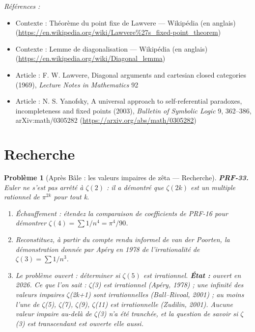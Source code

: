 \documentclass[11pt]{article}
\newtheorem{problem}{Problème}
\newenvironment{refs}{\par\small\noindent\emph{Références :}\begin{itemize}\setlength\itemsep{0pt}}{\end{itemize}\normalsize}
\begin{document}
\begin{refs}
\item Contexte : Théorème du point fixe de Lawvere --- Wikipédia (en anglais) (\url{https://en.wikipedia.org/wiki/Lawvere%27s_fixed-point_theorem})
\item Contexte : Lemme de diagonalisation --- Wikipédia (en anglais) (\url{https://en.wikipedia.org/wiki/Diagonal_lemma})
\item Article : F. W. Lawvere, \og{} Diagonal arguments and cartesian closed categories \fg{} (1969), \textit{Lecture Notes in Mathematics} 92
\item Article : N. S. Yanofsky, \og{} A universal approach to self-referential paradoxes, incompleteness and fixed points \fg{} (2003), \textit{Bulletin of Symbolic Logic} 9, 362--386, arXiv:math/0305282 (\url{https://arxiv.org/abs/math/0305282})
\end{refs}

\bigskip


\section*{Recherche}

\begin{problem}[{Après Bâle : les valeurs impaires de zêta --- Recherche}]
\textbf{PRF-33.} Euler ne s'est pas arrêté à $ \zeta(2) $ : il a démontré
que $ \zeta(2k) $ est un multiple rationnel de $ \pi^{2k} $ pour tout k.
\begin{enumerate}
\item[(a)] Échauffement :
étendez la comparaison de coefficients de PRF-16 pour démontrer
$ \zeta(4) = \sum 1/n^4 = \pi^4/90 $.
\item[(b)] Reconstituez, à partir du compte rendu informel de van der Poorten, la démonstration
donnée par Apéry en 1978 de l'irrationalité de $ \zeta(3) = \sum 1/n^3 $.
\item[(c)] Le problème ouvert : déterminer si $ \zeta(5) $ est irrationnel. \textbf{État :}
ouvert en 2026. Ce que l'on sait : $\zeta$(3) est irrationnel (Apéry, 1978) ; une infinité des
valeurs impaires $\zeta$(2k+1) sont irrationnelles (Ball--Rivoal, 2001) ; au moins l'une de $\zeta$(5),
$\zeta$(7), $\zeta$(9), $\zeta$(11) est irrationnelle (Zudilin, 2001). Aucune valeur impaire au-delà de $\zeta$(3)
n'a été tranchée, et la question de savoir si $\zeta$(3) est transcendant est ouverte elle
aussi.
\end{enumerate}

\end{problem}
\end{document}
